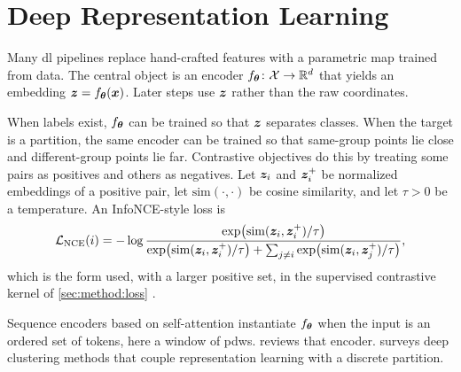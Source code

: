 \section{Deep Representation Learning}\label{sec:bg:dl}

Many \gls{dl} pipelines replace hand-crafted features with a parametric map trained from data.
The central object is an encoder \(f_{\bm{\theta}} \colon \mathcal{X} \to \mathbb{R}^{d}\) that yields an embedding \(\bm{z} = f_{\bm{\theta}}(\bm{x})\).
Later steps use \(\bm{z}\) rather than the raw coordinates.

When labels exist, \(f_{\bm{\theta}}\) can be trained so that \(\bm{z}\) separates classes.
When the target is a partition, the same encoder can be trained so that same-group points lie close and different-group points lie far.
Contrastive objectives do this by treating some pairs as positives and others as negatives.
Let \(\bm{z}_i\) and \(\bm{z}_{i}^{+}\) be normalized embeddings of a positive pair, let \(\mathrm{sim}(\cdot,\cdot)\) be cosine similarity, and let \(\tau>0\) be a temperature.
An InfoNCE-style loss is
\begin{equation}
\label{eq:bg:infonce}
\mathcal{L}_{\mathrm{NCE}}(i)
=
-\log
\frac{\exp\bigl(\mathrm{sim}(\bm{z}_i,\bm{z}_{i}^{+})/\tau\bigr)}
{\exp\bigl(\mathrm{sim}(\bm{z}_i,\bm{z}_{i}^{+})/\tau\bigr)
 + \sum_{j \neq i} \exp\bigl(\mathrm{sim}(\bm{z}_i,\bm{z}_{j}^{+})/\tau\bigr)},
\end{equation}
which is the form used, with a larger positive set, in the supervised contrastive kernel of \cref{sec:method:loss} \parencite{oord2018representation,chen2020simclr,khosla2020supcon}.

Sequence encoders based on self-attention instantiate \(f_{\bm{\theta}}\) when the input is an ordered set of tokens, here a window of \glspl{pdw}.
 reviews that encoder.
 surveys deep clustering methods that couple representation learning with a discrete partition.
